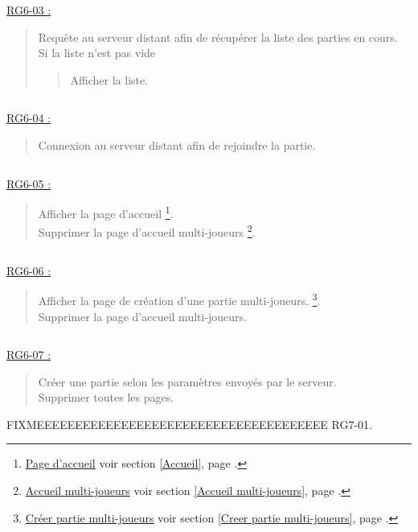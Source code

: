\documentclass{report}
\begin{document}
			$\,$
				
			\underline{RG6-03 :}
				\begin{quote}
					Requête au serveur distant afin de récupérer la liste des parties en cours.\\
					Si la liste n'est pas vide
					\begin{quote}
						Afficher la liste.
					\end{quote}								
				\end{quote}

			$\,$
				
			\underline{RG6-04 :}
				\begin{quote}
					Connexion au serveur distant afin de rejoindre la partie.
				\end{quote}

			$\,$
				
			\underline{RG6-05 :}
				\begin{quote}
					Afficher la page d'accueil%
						\footnote[1]{
							\hyperlink{Page d'accueil}{Page d'accueil}
							\og voir section \ref{Accueil}, page \pageref{Accueil}.\fg
						}.\\
					Supprimer la page d'accueil multi-joueurs%
						\footnote[2]{
							\hyperlink{Accueil multi-joueurs}{Accueil multi-joueurs}
							\og voir section \ref{Accueil multi-joueurs}, page \pageref{Accueil multi-joueurs}.\fg
						}.
				\end{quote}

			$\,$

			\underline{RG6-06 :}
				\begin{quote}
					Afficher la page de création d'une partie multi-joueurs.%
						\footnote[3]{
							\hyperlink{Creer partie multi-joueurs}{Créer partie multi-joueurs}
							\og voir section \ref{Creer partie multi-joueurs}, page \pageref{Creer partie multi-joueurs}.\fg
						}.\\
					Supprimer la page d'accueil multi-joueurs\footnotemark[2].
				\end{quote}

			$\,$

			\underline{RG6-07 :}
				\begin{quote}
					Créer une partie selon les paramètres envoyés par le serveur.\\
					Supprimer toutes les pages.
				\end{quote}

				
\newpage

	FIXMEEEEEEEEEEEEEEEEEEEEEEEEEEEEEEEEEEEEEE RG7-01.\\
\end{document}
